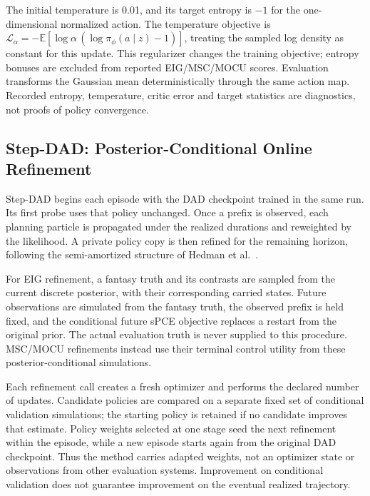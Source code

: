 \documentclass[journal]{IEEEtran}
\newcommand{\E}{\mathbb{E}}
\begin{document}
The initial temperature is 0.01, and its target entropy is $-1$ for the
one-dimensional normalized action. The temperature objective is
$\mathcal L_\alpha=-\E[\log\alpha\,
(\log\pi_\phi(a\mid z)-1)]$, treating the sampled log density as constant
for this update. This regularizer changes the training objective; entropy
bonuses are excluded from reported EIG/MSC/MOCU scores. Evaluation transforms
the Gaussian mean deterministically through the same action map. Recorded
entropy, temperature, critic error and target statistics are diagnostics,
not proofs of policy convergence.

\subsection{Step-DAD: Posterior-Conditional Online Refinement}
Step-DAD begins each episode with the DAD checkpoint trained in the same run.
Its first probe uses that policy unchanged. Once a prefix is observed, each
planning particle is propagated under the realized durations and reweighted
by the likelihood. A private policy copy is then refined for the remaining
horizon, following the semi-amortized structure of
Hedman et al.~\cite{hedman2025stepdad}.

For EIG refinement, a fantasy truth and its contrasts are sampled from the
current discrete posterior, with their corresponding carried states. Future
observations are simulated from the fantasy truth, the observed prefix is held
fixed, and the conditional future sPCE objective replaces a restart from the
original prior. The actual evaluation truth is never supplied to this procedure.
MSC/MOCU refinements instead use their terminal control utility from these
posterior-conditional simulations.

Each refinement call creates a fresh optimizer and performs the declared
number of updates. Candidate policies are compared on a separate fixed set of
conditional validation simulations; the starting policy is retained if no
candidate improves that estimate. Policy weights selected at one stage seed
the next refinement within the episode, while a new episode starts again from
the original DAD checkpoint. Thus the method carries adapted weights, not an
optimizer state or observations from other evaluation systems. Improvement
on conditional validation does not guarantee improvement on the eventual
realized trajectory.
\end{document}
